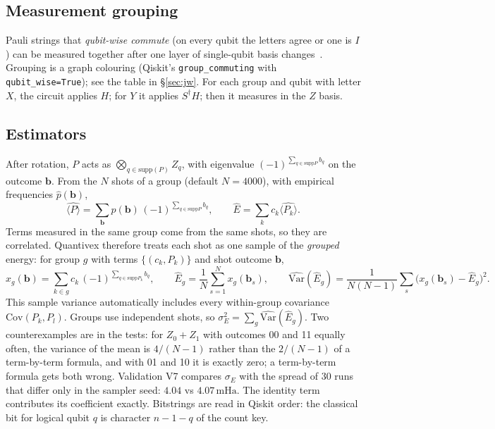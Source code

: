 \documentclass[10pt,a4paper]{article}
\newcommand{\mHa}{\,\mathrm{mHa}}
\newcommand{\code}[1]{\texttt{\small #1}}
\begin{document}
\subsection{Measurement grouping}
Pauli strings that \emph{qubit-wise commute} (on every qubit the letters agree or one is $I$) can be measured together after one layer of single-qubit basis changes~\cite{Kandala2017}. Grouping is a graph colouring (Qiskit's \code{group\_commuting} with \code{qubit\_wise=True}); see the table in \S\ref{sec:jw}. For each group and qubit with letter $X$, the circuit applies $H$; for $Y$ it applies $S^\dagger H$; then it measures in the $Z$ basis.

\subsection{Estimators}
After rotation, $P$ acts as $\bigotimes_{q\in\mathrm{supp}(P)}Z_q$, with eigenvalue $(-1)^{\sum_{q\in\mathrm{supp}P}b_q}$ on the outcome $\mathbf b$. From the $N$ shots of a group (default $N=4000$), with empirical frequencies $\hat p(\mathbf b)$,
\begin{equation}
\widehat{\langle P\rangle}=\sum_{\mathbf b}\hat p(\mathbf b)\,(-1)^{\sum_{q\in\mathrm{supp}P}b_q},\qquad
\widehat{E}=\sum_k c_k\widehat{\langle P_k\rangle}.
\end{equation}
Terms measured in the same group come from the same shots, so they are correlated. Quantivex therefore treats each shot as one sample of the \emph{grouped} energy: for group $g$ with terms $\{(c_k,P_k)\}$ and shot outcome $\mathbf b$,
\begin{equation}
x_g(\mathbf b)=\sum_{k\in g}c_k\,(-1)^{\sum_{q\in\mathrm{supp}P_k}b_q},\qquad
\widehat E_g=\frac1N\sum_{s=1}^{N}x_g(\mathbf b_s),\qquad
\widehat{\mathrm{Var}}(\widehat E_g)=\frac{1}{N(N-1)}\sum_{s}\bigl(x_g(\mathbf b_s)-\widehat E_g\bigr)^2 .
\end{equation}
This sample variance automatically includes every within-group covariance $\mathrm{Cov}(P_k,P_l)$. Groups use independent shots, so $\sigma_E^2=\sum_g\widehat{\mathrm{Var}}(\widehat E_g)$. Two counterexamples are in the tests: for $Z_0+Z_1$ with outcomes 00 and 11 equally often, the variance of the mean is $4/(N-1)$ rather than the $2/(N-1)$ of a term-by-term formula, and with 01 and 10 it is exactly zero; a term-by-term formula gets both wrong. Validation V7 compares $\sigma_E$ with the spread of 30 runs that differ only in the sampler seed: $4.04$ vs $4.07\mHa$. The identity term contributes its coefficient exactly. Bitstrings are read in Qiskit order: the classical bit for logical qubit $q$ is character $n-1-q$ of the count key.
\end{document}
